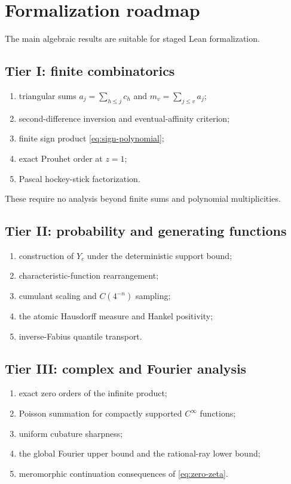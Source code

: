 \documentclass[11pt]{article}
\numberwithin{equation}{section}
\theoremstyle{definition}
\theoremstyle{remark}
\begin{document}
\section{Formalization roadmap}
\label{sec:formalization}

The main algebraic results are suitable for staged Lean formalization.

\subsection{Tier I: finite combinatorics}
\begin{enumerate}[leftmargin=*]
\item triangular sums $a_j=\sum_{h\le j}c_h$ and
      $m_v=\sum_{j\le v}a_j$;
\item second-difference inversion and eventual-affinity criterion;
\item finite sign product \eqref{eq:sign-polynomial};
\item exact Prouhet order at $z=1$;
\item Pascal hockey-stick factorization.
\end{enumerate}
These require no analysis beyond finite sums and polynomial multiplicities.

\subsection{Tier II: probability and generating functions}
\begin{enumerate}[leftmargin=*]
\item construction of $Y_c$ under the deterministic support bound;
\item characteristic-function rearrangement;
\item cumulant scaling and $C(4^{-n})$ sampling;
\item the atomic Hausdorff measure and Hankel positivity;
\item inverse-Fabius quantile transport.
\end{enumerate}

\subsection{Tier III: complex and Fourier analysis}
\begin{enumerate}[leftmargin=*]
\item exact zero orders of the infinite product;
\item Poisson summation for compactly supported $C^\infty$ functions;
\item uniform cubature sharpness;
\item the global Fourier upper bound and the rational-ray lower bound;
\item meromorphic continuation consequences of \eqref{eq:zero-zeta}.
\end{enumerate}
\end{document}
